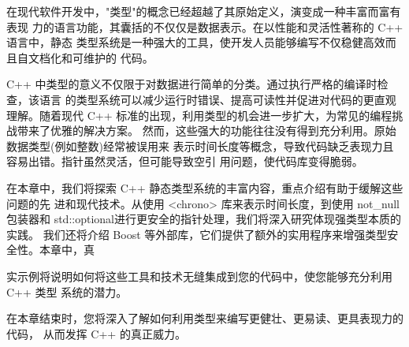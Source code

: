 在现代软件开发中，"类型"的概念已经超越了其原始定义，演变成一种丰富而富有表现
力的语言功能，其囊括的不仅仅是数据表示。在以性能和灵活性著称的 C++ 语言中，静态
类型系统是一种强大的工具，使开发人员能够编写不仅稳健高效而且自文档化和可维护的
代码。

C++ 中类型的意义不仅限于对数据进行简单的分类。通过执行严格的编译时检查，该语言
的类型系统可以减少运行时错误、提高可读性并促进对代码的更直观理解。随着现代 C++
标准的出现，利用类型的机会进一步扩大，为常见的编程挑战带来了优雅的解决方案。
然而，这些强大的功能往往没有得到充分利用。原始数据类型(例如整数)经常被误用来
表示时间长度等概念，导致代码缺乏表现力且容易出错。指针虽然灵活，但可能导致空引
用问题，使代码库变得脆弱。

在本章中，我们将探索 C++ 静态类型系统的丰富内容，重点介绍有助于缓解这些问题的先
进和现代技术。从使用 <chrono> 库来表示时间长度，到使用 not\_null 包装器和 std::optional进行更安全的指针处理，我们将深入研究体现强类型本质的实践。
我们还将介绍 Boost 等外部库，它们提供了额外的实用程序来增强类型安全性。本章中，真

实示例将说明如何将这些工具和技术无缝集成到您的代码中，使您能够充分利用 C++ 类型
系统的潜力。

在本章结束时，您将深入了解如何利用类型来编写更健壮、更易读、更具表现力的代码，
从而发挥 C++ 的真正威力。
